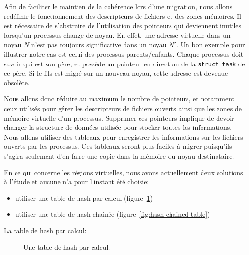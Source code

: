      Afin de faciliter le maintien de la cohérence lors d'une migration, nous
      allons redéfinir le fonctionnement des descripteurs de fichiers et des
      zones mémoires. Il est nécessaire de s'abstraire de l'utilisation des
      pointeurs qui deviennent inutiles lorsqu'un processus change de noyau. En
      effet, une adresse virtuelle dans un noyau $N$ n'est pas toujours
      significative dans un noyau $N'$. Un bon exemple pour illustrer notre cas
      est celui des processus parents/enfants. Chaque processus doit savoir qui
      est son père, et possède un pointeur en direction de la \texttt{struct
        task} de ce père. Si le fils est migré sur un nouveau noyau, cette
      adresse est devenue obsolète.

      Nous allons donc réduire au maximum le nombre de pointeurs, et notamment
      ceux utilisés pour gérer les descripteurs de fichiers ouverts ainsi que
      les zones de mémoire virtuelle d'un processus.  Supprimer ces pointeurs
      implique de devoir changer la structure de données utilisée pour stocker
      toutes les informations. Nous allons utiliser des tableaux pour
      enregistrer les informations sur les fichiers ouverts par les
      processus. Ces tableaux seront plus faciles à migrer puisqu'ils s'agira
      seulement d'en faire une copie dans la mémoire du noyau destinataire.

      En ce qui concerne les régions virtuelles, nous avons actuellement deux
      solutions à l'étude et aucune n'a pour l'instant été choisie:
      \begin{itemize}
        \item utiliser une table de hash par calcul
          (figure~\ref{fig:calculated-hash-table})
        \item utiliser une table de hash chainée
          (figure~\ref{fig:hash-chained-table})
      \end{itemize}

      \begin{paragraph}{La table de hash par calcul:}

        \todo{}
        \begin{figure}[ht]
          \centering
          \caption{Une table de hash par calcul.}
          \label{fig:calculated-hash-table}
        \end{figure}

      \end{paragraph}


